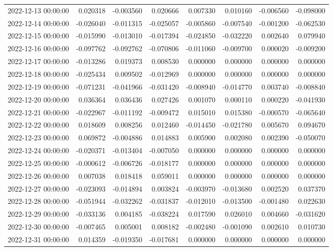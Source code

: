 \begin{tabular}{lrrrrrrr}
2022-12-13 00:00:00 & 0.020318 & -0.003560 & 0.020666 & 0.007330 & 0.010160 & -0.006560 & -0.098000 \\
2022-12-14 00:00:00 & -0.026040 & -0.011315 & -0.025057 & -0.005860 & -0.007540 & -0.001200 & -0.062530 \\
2022-12-15 00:00:00 & -0.015990 & -0.013010 & -0.017394 & -0.024850 & -0.032220 & 0.002640 & 0.079940 \\
2022-12-16 00:00:00 & -0.097762 & -0.092762 & -0.070806 & -0.011060 & -0.009700 & 0.000020 & -0.009200 \\
2022-12-17 00:00:00 & -0.013286 & 0.019373 & 0.008530 & 0.000000 & 0.000000 & 0.000000 & 0.000000 \\
2022-12-18 00:00:00 & -0.025434 & 0.009502 & -0.012969 & 0.000000 & 0.000000 & 0.000000 & 0.000000 \\
2022-12-19 00:00:00 & -0.071231 & -0.041966 & -0.031420 & -0.008940 & -0.014770 & 0.003740 & -0.008840 \\
2022-12-20 00:00:00 & 0.036364 & 0.036436 & 0.027426 & 0.001070 & 0.000110 & 0.000220 & -0.041930 \\
2022-12-21 00:00:00 & -0.022967 & -0.011192 & -0.009472 & 0.015010 & 0.015380 & -0.000570 & -0.065640 \\
2022-12-22 00:00:00 & 0.018609 & 0.008256 & 0.012460 & -0.014450 & -0.021780 & 0.005670 & 0.094670 \\
2022-12-23 00:00:00 & 0.069872 & -0.004886 & 0.014883 & 0.005900 & 0.002080 & 0.002390 & -0.050070 \\
2022-12-24 00:00:00 & -0.020371 & -0.013404 & -0.007050 & 0.000000 & 0.000000 & 0.000000 & 0.000000 \\
2022-12-25 00:00:00 & -0.000612 & -0.006726 & -0.018177 & 0.000000 & 0.000000 & 0.000000 & 0.000000 \\
2022-12-26 00:00:00 & 0.007038 & 0.018418 & 0.059011 & 0.000000 & 0.000000 & 0.000000 & 0.000000 \\
2022-12-27 00:00:00 & -0.023093 & -0.014894 & 0.003824 & -0.003970 & -0.013680 & 0.002520 & 0.037370 \\
2022-12-28 00:00:00 & -0.051944 & -0.032262 & -0.031837 & -0.012010 & -0.013500 & -0.001480 & 0.022630 \\
2022-12-29 00:00:00 & -0.033136 & 0.004185 & -0.038224 & 0.017590 & 0.026010 & 0.004660 & -0.031620 \\
2022-12-30 00:00:00 & -0.007465 & 0.005001 & 0.008182 & -0.002480 & -0.001090 & 0.002610 & 0.010730 \\
2022-12-31 00:00:00 & 0.014359 & -0.019350 & -0.017681 & 0.000000 & 0.000000 & 0.000000 & 0.000000 \\

\end{tabular}
